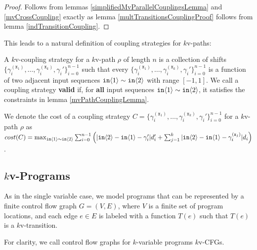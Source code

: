 \begin{proof}
    Follows from lemmas \ref{simplifiedMvParallelCouplingsLemma} and \ref{mvCrossCoupling} exactly as lemma \ref{multTransitionsCouplingProof} follows from lemma \ref{indTransitionCoupling}.
\end{proof}

This leads to a natural definition of coupling strategies for $k$v-paths:

\begin{defn}
    A $k$v-coupling strategy for a $k$v-path $\rho$ of length $n$ is a collection of shifts $\{\gamma_i^{(\texttt{x}_1)},\ldots, \gamma_i^{(\texttt{x}_k)}, \gamma_i'\}_{i=0}^{n-1}$ such that every $\{\gamma_i^{(\texttt{x}_1)},\ldots, \gamma_i^{(\texttt{x}_k)}, \gamma_i'\}_{i=0}^{n-1}$ is a function of two adjacent input sequences $\texttt{in}\langle1 \rangle\sim \texttt{in}\langle2 \rangle$ with range $[-1, 1]$. 
    We call a coupling strategy \textbf{valid} if, for \textbf{all} input sequences $\texttt{in}\langle1 \rangle\sim\texttt{in}\langle2 \rangle$, it satisfies the constraints in lemma \ref{mvPathCouplingLemma}.
\end{defn}

We denote the cost of a coupling strategy $C=\{\gamma_i^{(\texttt{x}_1)},\ldots, \gamma_i^{(\texttt{x}_k)}, \gamma_i'\}_{i=0}^{n-1}$ for a $k$v-path $\rho$ as $cost(C) = \max_{\texttt{in}\langle1 \rangle\sim\texttt{in}\langle2 \rangle}\sum_{i=0}^{n-1}\left(|\texttt{in}\langle2 \rangle-\texttt{in}\langle1 \rangle-\gamma_i'|d_i'+\sum_{j=1}^k|\texttt{in}\langle2 \rangle-\texttt{in}\langle1 \rangle-\gamma_i^{(\texttt{x}_j)}|d_i\right)$.

\subsection{$k$v-Programs}

As in the single variable case, we model programs that can be represented by a finite control flow graph $G = (V, E)$, where $V$ is a finite set of program locations, and each edge $e\in E$ is labeled with a function $T(e)$ such that $T(e)$ is a $k$v-transition. 

For clarity, we call control flow graphs for $k$-variable programs $k$v-CFGs. 


